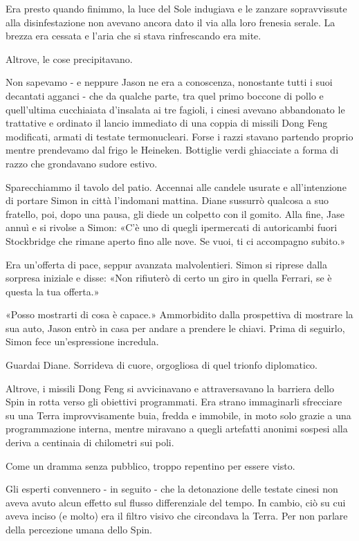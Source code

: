 \separatorefiori

Era presto quando finimmo, la luce del Sole indugiava e le zanzare
sopravvissute alla disinfestazione non avevano ancora dato il via alla
loro frenesia serale. La brezza era cessata e l'aria che si stava
rinfrescando era mite.

Altrove, le cose precipitavano.

Non sapevamo - e neppure Jason ne era a conoscenza, nonostante tutti i
suoi decantati agganci - che da qualche parte, tra quel primo boccone di
pollo e quell'ultima cucchiaiata d'insalata ai tre fagioli, i cinesi
avevano abbandonato le trattative e ordinato il lancio immediato di una
coppia di missili Dong Feng modificati, armati di testate termonucleari.
Forse i razzi stavano partendo proprio mentre prendevamo dal frigo le
Heineken. Bottiglie verdi ghiacciate a forma di razzo che grondavano
sudore estivo.

Sparecchiammo il tavolo del patio. Accennai alle candele usurate e
all'intenzione di portare Simon in città l'indomani mattina. Diane
sussurrò qualcosa a suo fratello, poi, dopo una pausa, gli diede un
colpetto con il gomito. Alla fine, Jase annuì e si rivolse a Simon: «C'è
uno di quegli ipermercati di autoricambi fuori Stockbridge che rimane
aperto fino alle nove. Se vuoi, ti ci accompagno subito.»

Era un'offerta di pace, seppur avanzata malvolentieri. Simon si riprese
dalla sorpresa iniziale e disse: «Non rifiuterò di certo un giro in
quella Ferrari, se è questa la tua offerta.»

«Posso mostrarti di cosa è capace.» Ammorbidito dalla prospettiva di
mostrare la sua auto, Jason entrò in casa per andare a prendere le
chiavi. Prima di seguirlo, Simon fece un'espressione incredula.

Guardai Diane. Sorrideva di cuore, orgogliosa di quel trionfo
diplomatico.

Altrove, i missili Dong Feng si avvicinavano e attraversavano la
barriera dello Spin in rotta verso gli obiettivi programmati. Era strano
immaginarli sfrecciare su una Terra improvvisamente buia, fredda e
immobile, in moto solo grazie a una programmazione interna, mentre
miravano a quegli artefatti anonimi sospesi alla deriva a centinaia di
chilometri sui poli.

Come un dramma senza pubblico, troppo repentino per essere visto.

\separatorefiori

Gli esperti convennero - in seguito - che la detonazione delle testate
cinesi non aveva avuto alcun effetto sul flusso differenziale del tempo.
In cambio, ciò su cui aveva inciso (e molto) era il filtro visivo che
circondava la Terra. Per non parlare della percezione umana dello Spin.

